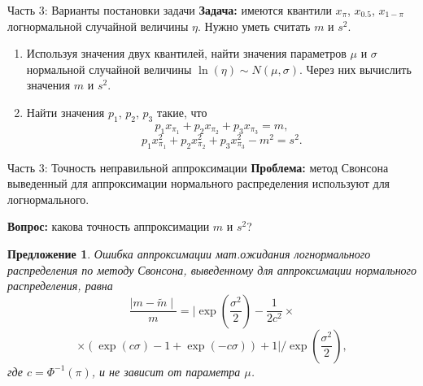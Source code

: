 \documentclass[ucs, notheorems, handout]{beamer}
\newtheorem{proposition2}[theorem]{Предложение}
\begin{document}
	\begin{frame}{Часть 3: Варианты постановки задачи}
		\textbf{Задача:} имеются квантили $x_{\pi}$, $x_{0.5}$, $x_{1-\pi}$ логнормальной случайной величины $\eta$. Нужно уметь считать $m$ и $s^{2}$.
		
		\begin{enumerate}
			\item Используя значения двух квантилей, найти значения параметров $\mu$ и $\sigma$ нормальной случайной величины $\ln(\eta)\sim N(\mu, \sigma)$. Через них вычислить значения $m$ и $s^{2}$.
			\item Найти значения $p_{1}$, $p_{2}$, $p_{3}$ такие, что 
			\begin{equation*}
				p_{1}x_{\pi_{1}} + p_{2}x_{\pi_{2}} + p_{3}x_{\pi_{3}} = m, \label{2}
			\end{equation*}
			\begin{equation*}
				p_{1} x_{\pi_{1}}^{2} + p_{2} x_{\pi_{2}}^{2} + p_{3} x_{\pi_{3}}^{2} - m^{2} = s^{2}.
			\end{equation*}

		\end{enumerate}
		
	\end{frame}
	
	\begin{frame}{Часть 3: Точность неправильной аппроксимации}
		\textbf{Проблема:} метод Свонсона выведенный для аппроксимации нормального распределения используют для логнормального.
		
		\textbf{Вопрос:} какова точность аппроксимации $m$ и $s^{2}$?
		
		\begin{proposition2}\label{pr5}
			Ошибка аппроксимации мат.ожидания логнормального распределения по методу Свонсона, выведенному для аппроксимации нормального распределения, равна
			\[\dfrac{\mid m - \widetilde{m} \mid}{m} = \biggl| \exp\left( \dfrac{\sigma^{2}}{2}\right)  - \dfrac{1}{2 c^{2}}\times\]\[\times(\exp(c\sigma)-1 +\exp(-c\sigma)) + 1 \biggr|/\exp\left(\dfrac{\sigma^{2}}{2}\right),\]
			где $c = \Phi^{-1}(\pi)$, и не зависит от параметра $\mu$.
		\end{proposition2}
	
	\end{frame}
	
\end{document}
